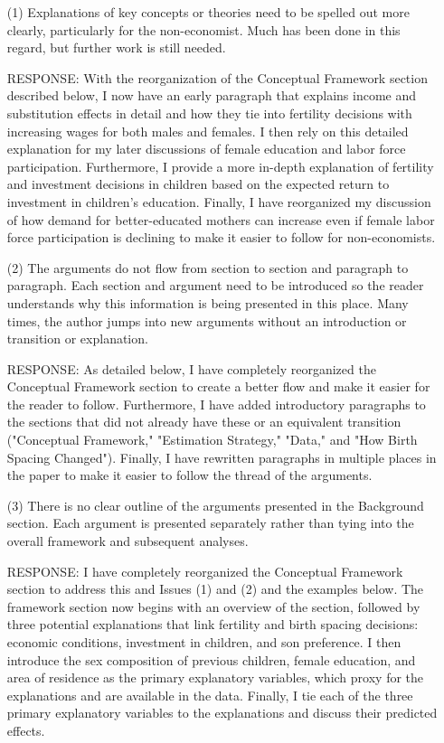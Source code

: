 \documentclass[letterpaper,12pt]{article}
\begin{document}
\begin{itemize}
\item[(1)] Explanations of key concepts or theories need to be spelled out more clearly,
particularly for the non-economist. Much has been done in this regard, but further work is
still needed.

RESPONSE: With the reorganization of the Conceptual Framework section described below, I now 
have an early paragraph that explains income and substitution effects in detail and how they 
tie into fertility decisions with increasing wages for both males and females.
I then rely on this detailed explanation for my later discussions of female education and
labor force participation.
Furthermore, I provide a more in-depth explanation of fertility and investment decisions in
children based on the expected return to investment in children's education.
Finally, I have reorganized my discussion of how demand for better-educated mothers can
increase even if female labor force participation is declining to make it easier to follow
for non-economists.


\item[(2)] The arguments do not flow from section to section and paragraph to paragraph. Each
section and argument need to be introduced so the reader understands why this information
is being presented in this place. Many times, the author jumps into new arguments without
an introduction or transition or explanation.

RESPONSE: As detailed below, I have completely reorganized the Conceptual Framework section
to create a better flow and make it easier for the reader to follow.
Furthermore, I have added introductory paragraphs to the sections that did not already 
have these or an equivalent transition ("Conceptual Framework," "Estimation Strategy," "Data," 
and "How Birth Spacing Changed").
Finally, I have rewritten paragraphs in multiple places in the paper to make it easier 
to follow the thread of the arguments.


\item[(3)] There is no clear outline of the arguments presented in the Background section. Each
argument is presented separately rather than tying into the overall framework and
subsequent analyses.

RESPONSE: I have completely reorganized the Conceptual Framework section to address this
and  Issues (1) and (2) and the examples below.
The framework section now begins with an overview of the section, followed by three 
potential explanations that link fertility and birth spacing decisions: economic conditions, 
investment in children, and son preference.
I then introduce the sex composition of previous children, female education, and area of
residence as the primary explanatory variables, which proxy for the explanations and are
available in the data.
Finally, I tie each of the three primary explanatory variables to the explanations and
discuss their predicted effects.

\end{itemize}
\end{document}
